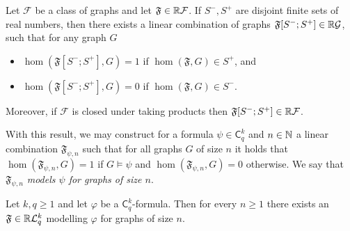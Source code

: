\documentclass{lmcs}
\theoremstyle{plain}\newtheorem{claim}[thm]{Claim}   %
\newcommand{\NN}{\ensuremath \mathbb{N}}
\newcommand{\RR}{\ensuremath \mathbb{R}}
\newcommand{\cL}{\ensuremath{\mathcal L}}
\newcommand{\Lkq}{\ensuremath{\cL_{q}^{k}}}
\newcommand{\lC} {\ensuremath{\mathsf C}}
\newcommand{\qg}[1]{\ensuremath{\mathfrak{#1}}}
\newcommand{\qgp}[3]{\ensuremath{\mathfrak{#1}[#3; #2]}}
\renewcommand\phi\varphi
\begin{document}
\begin{lemC}
	\label{lem:qginterpolation}
	Let $\mathcal{F}$ be a class of graphs and let $\qg{F} \in \RR\mathcal{F}$.
	If $S^-, S^+$ are disjoint finite sets of real numbers, then there exists a linear combination of graphs $\qgp{F}{S^+}{S^-} \in \RR\mathcal{G}$, such that for any graph $G$
	\begin{itemize}
		\item $\hom(\qgp{F}{S^+}{S^-}, G) = 1$ if $\hom(\qg{F}, G) \in S^+$, and
		\item $\hom(\qgp{F}{S^+}{S^-}, G) = 0$ if $\hom(\qg{F}, G) \in S^-$.
	\end{itemize}
	Moreover, if $\mathcal{F}$ is closed under taking products then $\qgp{F}{S^+}{S^-} \in \RR\mathcal{F}$.
\end{lemC}

With this result, we may construct for a formula $\psi \in \lC^k_q$ and $n \in \NN$ a linear combination $\qg{F}_{\psi, n}$ such that for all graphs $G$ of size $n$ it holds that $\hom(\qg{F}_{\psi, n}, G) = 1$ if $G \models \psi$ and $\hom(\qg{F}_{\psi, n}, G) = 0$ otherwise.
We say that $\qg{F}_{\psi, n}$ \emph{models $\psi$ for graphs of size $n$}.

\begin{lem}
	\label{lem:qg_from_ckq}
	Let $k, q \geq 1$ and let $\phi$ be a $\lC^k_q$-formula.
	Then for every $n \geq 1$ there exists an $\qg{F} \in \RR\Lkq$ modelling $\phi$ for graphs of size $n$.
\end{lem}
\end{document}
